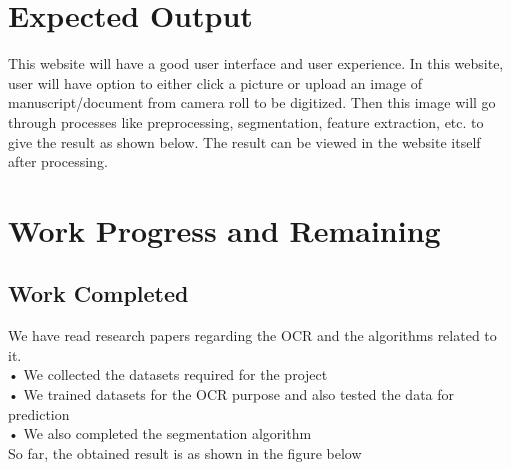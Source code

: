 \section{Expected Output}
This website will have a good user interface and user experience. In this website, user will have option to either click a picture or upload an image of manuscript/document from camera roll to be digitized. Then this image will go through processes like preprocessing, segmentation, feature extraction, etc. to give the result as shown below. The result can be viewed in the website itself after processing.   

\section{Work Progress and Remaining}
\subsection{Work Completed}
We have read research papers regarding the OCR and the algorithms related to it.\\
•	We collected the datasets required for the project \\
•	We trained datasets for the OCR purpose and also tested the        data for prediction\\
•   We also completed the segmentation algorithm\\
So far, the obtained result is as shown in the figure below


